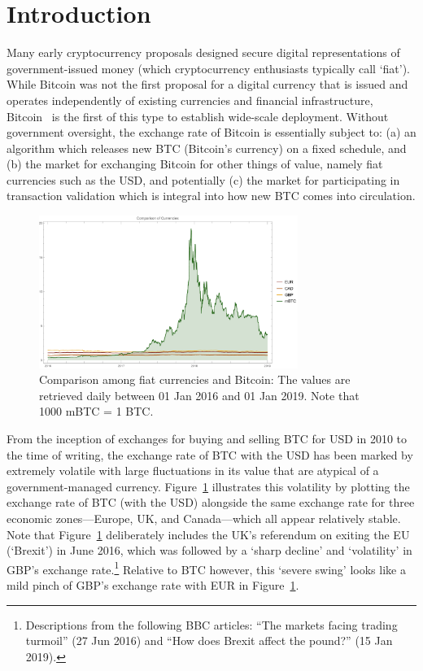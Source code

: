 
\section{Introduction}\label{sec:Intro}

Many early cryptocurrency proposals designed secure digital representations of government-issued money (which cryptocurrency enthusiasts typically call `fiat'). While Bitcoin was not the first proposal for a digital currency that is issued and operates independently of existing currencies and financial infrastructure, Bitcoin~\cite{nakamoto2008bitcoin} is the first of this type to establish wide-scale deployment. Without government oversight, the exchange rate of Bitcoin is essentially subject to: (a) an algorithm which releases new BTC (Bitcoin's currency) on a fixed schedule, and (b) the market for exchanging Bitcoin for other things of value, namely fiat currencies such as the USD, and potentially (c) the market for participating in transaction validation which is integral into how new BTC comes into circulation.

\begin{figure}[t]
	\centering
	\includegraphics[width=0.75\textwidth]{figures/allCurrencies.pdf}
	\caption{\label{fig:btcandfiat}Comparison among fiat currencies and Bitcoin: The values are retrieved daily between  01 Jan 2016 and 01 Jan 2019. Note that 1000 mBTC = 1 BTC.}
\end{figure}

From the inception of exchanges for buying and selling BTC for USD in 2010 to the time of writing, the exchange rate of BTC with the USD has been marked by extremely volatile with large fluctuations in its value that are atypical of a government-managed currency. Figure~\ref{fig:btcandfiat} illustrates this volatility by plotting the exchange rate of BTC (with the USD) alongside the same exchange rate for three economic zones---Europe, UK, and Canada---which all appear relatively stable. Note that Figure~\ref{fig:btcandfiat} deliberately includes the UK's referendum on exiting the EU (`Brexit') in June 2016, which was followed by a `sharp decline' and `volatility' in GBP's exchange rate.\footnote{Descriptions from the following BBC articles: ``The markets facing trading turmoil'' (27 Jun 2016) and ``How does Brexit affect the pound?'' (15 Jan 2019).}  Relative to BTC however, this `severe swing' looks like a mild pinch of GBP's exchange rate with EUR in Figure~\ref{fig:btcandfiat}.

